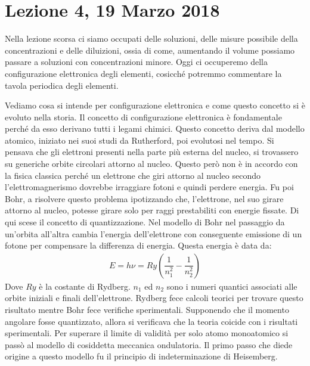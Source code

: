 \documentclass[../AppuntiChimica]{subfiles}
\begin{document}
	\section{Lezione 4, 19 Marzo 2018}
	Nella lezione scorsa ci siamo occupati delle soluzioni, delle misure possibile della concentrazioni e delle diluizioni, ossia di come, aumentando il volume possiamo passare a soluzioni con concentrazioni minore. Oggi ci occuperemo della configurazione elettronica degli elementi, cosicché potremmo commentare la tavola periodica degli elementi.
	
	Vediamo cosa si intende per configurazione elettronica e come questo concetto si è evoluto nella storia. Il concetto di configurazione elettronica è fondamentale perché da esso derivano tutti i legami chimici. Questo concetto deriva dal modello atomico, iniziato nei suoi studi da Rutherford, poi evolutosi nel tempo. Si pensava che gli elettroni presenti nella parte più esterna del nucleo, si trovassero su generiche orbite circolari attorno al nucleo. Questo però non è in accordo con la fisica classica perché un elettrone che giri attorno al nucleo secondo l'elettromagnerismo dovrebbe irraggiare fotoni e quindi perdere energia. Fu poi Bohr, a risolvere questo problema ipotizzando che, l'elettrone, nel suo girare attorno al nucleo, potesse girare solo per raggi prestabiliti con energie fissate. Di qui scese il concetto di quantizzazione. Nel modello di Bohr nel passaggio da un'orbita all'altra cambia l'energia dell'elettrone con conseguente emissione di un fotone per compensare la differenza di energia. Questa energia è data da:
	\begin{gather}
	E=h\nu=Ry\left(\dfrac{1}{n_{1}^{2}}-\dfrac{1}{n_{2}^{2}}\right)
	\end{gather}
	Dove $ Ry $ è la costante di Rydberg. $ n_{1} $ ed $ n_{2} $ sono i numeri quantici associati alle orbite iniziali e finali dell'elettrone. Rydberg fece calcoli teorici per trovare questo risultato mentre Bohr fece verifiche sperimentali. Supponendo che il momento angolare fosse quantizzato, allora si verificava che la teoria coicide con i risultati sperimentali. Per superare il limite di validità per solo atomo monoatomico si passò al modello di cosiddetta meccanica ondulatoria. Il primo passo che diede origine a questo modello fu il principio di indeterminazione di Heisemberg.
\end{document}
